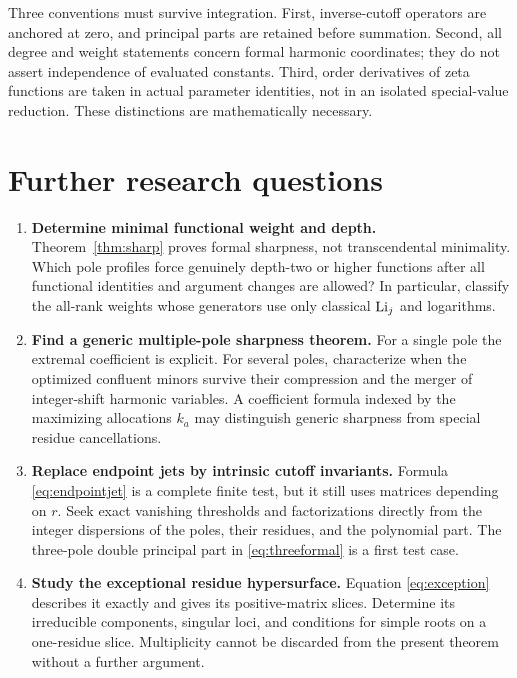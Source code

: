 \documentclass[11pt,letterpaper]{article}
\numberwithin{equation}{section}
\theoremstyle{definition}\newtheorem{definition}[theorem]{Definition}
\theoremstyle{remark}\newtheorem{remark}[theorem]{Remark}
\begin{document}
Three conventions must survive integration. First, inverse-cutoff
operators are anchored at zero, and principal parts are retained before
summation. Second, all degree and weight statements concern formal
harmonic coordinates; they do not assert independence of evaluated
constants. Third, order derivatives of zeta functions are taken in
actual parameter identities, not in an isolated special-value
reduction. These distinctions are mathematically necessary.

\section{Further research questions}
\label{sec:questions}

\begin{enumerate}[label=\textbf{Q\arabic*.},leftmargin=*]
\item \textbf{Determine minimal functional weight and depth.}
Theorem~\ref{thm:sharp} proves formal sharpness, not transcendental
minimality. Which pole profiles force genuinely depth-two or higher
functions after all functional identities and argument changes are
allowed? In particular, classify the all-rank weights whose generators
use only classical $\operatorname{Li}_j$ and logarithms.

\item \textbf{Find a generic multiple-pole sharpness theorem.}
For a single pole the extremal coefficient is explicit. For several
poles, characterize when the optimized confluent minors survive their
compression and the merger of integer-shift harmonic variables.
A coefficient formula indexed by the maximizing allocations $k_a$
may distinguish generic sharpness from special residue cancellations.

\item \textbf{Replace endpoint jets by intrinsic cutoff invariants.}
Formula \eqref{eq:endpointjet} is a complete finite test, but it still
uses matrices depending on $r$. Seek exact vanishing thresholds and
factorizations directly from the integer dispersions of the poles,
their residues, and the polynomial part. The three-pole double
principal part in \eqref{eq:threeformal} is a first test case.

\item \textbf{Study the exceptional residue hypersurface.}
Equation \eqref{eq:exception} describes it exactly and gives its
positive-matrix slices. Determine its irreducible components,
singular loci, and conditions for simple roots on a one-residue slice.
Multiplicity cannot be discarded from the present theorem without a
further argument.


\end{enumerate}
\end{document}

